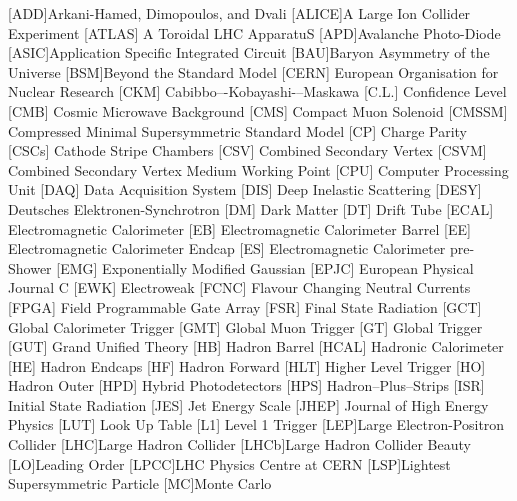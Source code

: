 \begin{acronym}[AAAAAAA]
[ADD]{Arkani-Hamed, Dimopoulos, and Dvali}
[ALICE]{A Large Ion Collider Experiment}
 [ATLAS] {A Toroidal LHC ApparatuS}
[APD]{Avalanche Photo-Diode}
[ASIC]{Application Specific Integrated Circuit}
[BAU]{Baryon Asymmetry of the Universe}
[BSM]{Beyond the Standard Model}
 [CERN] {European Organisation for Nuclear Research}
 [CKM] {Cabibbo–-Kobayashi-–Maskawa}
 [C.L.] {Confidence Level}
 [CMB] {Cosmic Microwave Background}
 [CMS] {Compact Muon Solenoid}
 [CMSSM] {Compressed Minimal Supersymmetric Standard Model}
 [CP] {Charge Parity}
 [CSCs] {Cathode Stripe Chambers}
 [CSV] {Combined Secondary Vertex}
 [CSVM] {Combined Secondary Vertex Medium Working Point}
 [CPU] {Computer Processing Unit}
 [DAQ] {Data Acquisition System}
 [DIS] {Deep Inelastic Scattering}
 [DESY] {Deutsches Elektronen-Synchrotron}
 [DM] {Dark Matter}
 [DT] {Drift Tube}
 [ECAL] {Electromagnetic Calorimeter}
 [EB] {Electromagnetic Calorimeter Barrel}
 [EE] {Electromagnetic Calorimeter Endcap}
 [ES] {Electromagnetic Calorimeter pre-Shower}
 [EMG] {Exponentially Modified Gaussian}
 [EPJC] {European Physical Journal C}
 [EWK] {Electroweak}
 [FCNC] {Flavour Changing Neutral Currents}
 [FPGA] {Field Programmable Gate Array}
 [FSR] {Final State Radiation}
 [GCT] {Global Calorimeter Trigger}
 [GMT] {Global Muon Trigger}
 [GT] {Global Trigger}
 [GUT] {Grand Unified Theory}
 [HB] {Hadron Barrel}
 [HCAL] {Hadronic Calorimeter}
 [HE] {Hadron Endcaps}
 [HF] {Hadron Forward}
[HLT] {Higher Level Trigger}
 [HO] {Hadron Outer}
 [HPD] {Hybrid Photodetectors}
 [HPS] {Hadron--Plus--Strips}
 [ISR] {Initial State Radiation}
 [JES] {Jet Energy Scale}
 [JHEP] {Journal of High Energy Physics}
 [LUT] {Look Up Table}
 [L1] {Level 1 Trigger}
[LEP]{Large Electron-Positron Collider}
[LHC]{Large Hadron Collider}
[LHCb]{Large Hadron Collider Beauty}
[LO]{Leading Order}
[LPCC]{LHC Physics Centre at CERN}
[LSP]{Lightest Supersymmetric Particle}
[MC]{Monte Carlo}

\end{acronym}
